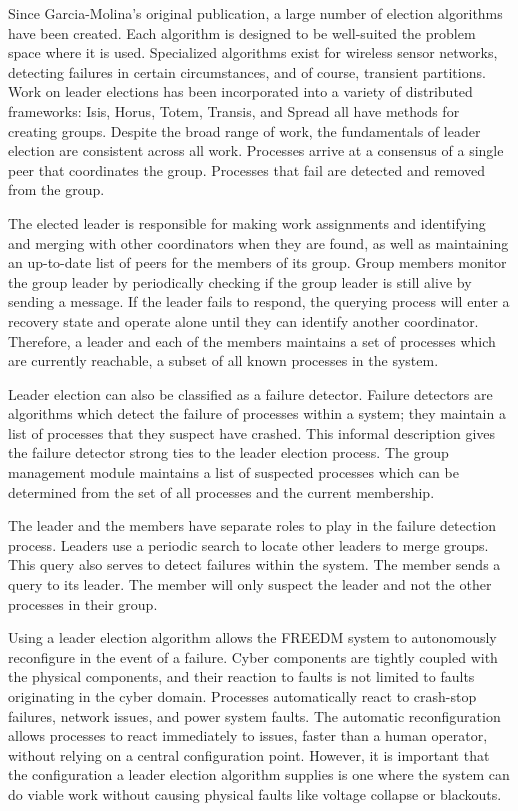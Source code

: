 Since Garcia-Molina's original publication\cite{INVITATIONELECTION}, a large number of election algorithms have been created. 
Each algorithm is designed to be well-suited the problem space where it is used.
Specialized algorithms exist for wireless sensor networks\cite{LE-WSN-1}\cite{LE-WSN-2}, detecting failures in certain circumstances\cite{LE-SPECIALCIRCUMSTANCES-1}\cite{LE-SPECIALCIRCUMSTANCES-2}, and of course, transient partitions.
Work on leader elections has been incorporated into a variety of distributed frameworks: Isis\cite{ISISTOOLKIT}, Horus\cite{HORUSTOOLKIT}, Totem\cite{TOTEMTOOLKIT}, Transis\cite{TRANSISTOOLKIT}, and Spread\cite{SPREADTOOLKIT} all have methods for creating groups.
Despite the broad range of work, the fundamentals of leader election are consistent
across all work.
Processes arrive at a consensus of a single peer that coordinates the group.
Processes that fail are detected and removed from the group. 

The elected leader is responsible for making work assignments and identifying and merging with other coordinators when they are found, as well as maintaining an up-to-date list of peers for the members of its group. 
Group members monitor the group leader by periodically checking if the group leader is still alive by sending a message. 
If the leader fails to respond, the querying process will enter a recovery state and operate alone until
they can identify another coordinator.
Therefore, a leader and each of the members maintains a set of processes which are currently reachable, a subset of all known processes in the system.

Leader election can also be classified as a failure detector\cite{LEADERELECTIONEVAL}.
Failure detectors are algorithms which detect the failure of processes within a system; they maintain a list of processes that they suspect have crashed.
This informal description gives the failure detector strong ties to the leader election process. 
The group management module maintains a list of suspected processes which can be determined from the set of all processes and the current membership.

The leader and the members have separate roles to play in the failure detection process.
Leaders use a periodic search to locate other leaders to merge groups.
This query also serves to detect failures within the system.
The member sends a query to its leader.
The member will only suspect the leader and not the other processes in their group.

Using a leader election algorithm allows the \ac{FREEDM} system to autonomously reconfigure in the event of a failure.
Cyber components are tightly coupled with the physical components, and their reaction to faults is not limited to faults originating in the cyber domain.
Processes automatically react to crash-stop failures, network issues, and power system faults.
The automatic reconfiguration allows processes to react immediately to issues, faster than a human operator, without relying on a central configuration point.
However, it is important that the configuration a leader election algorithm supplies is one where the system can do viable work without causing physical faults like voltage collapse or blackouts\cite{HARINI}.

